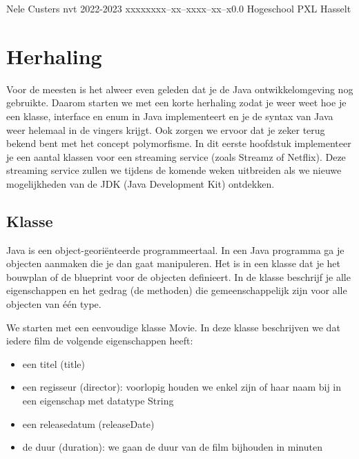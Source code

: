 \documentclass{tstextbook}
\begin{document}
       {Nele Custers}
       {nvt}
       {2022-2023}
       {xxxxx}{xxx--xx--xxxx--xx--x}{0.0}
       {Hogeschool PXL}
       {Hasselt}
       
\pagebreak



\chapter{Herhaling}

\begin{summary}
Voor de meesten is het alweer even geleden dat je de Java ontwikkelomgeving nog gebruikte. Daarom starten we met een korte herhaling zodat je weer weet hoe je een klasse, interface en enum in Java implementeert en je de syntax van Java weer helemaal in de vingers krijgt. Ook zorgen we ervoor dat je zeker terug bekend bent met het concept polymorfisme. In dit eerste hoofdstuk implementeer je een aantal klassen voor een streaming service (zoals Streamz of Netflix). Deze streaming service zullen we tijdens de komende weken uitbreiden als we nieuwe mogelijkheden van de JDK (Java Development Kit) ontdekken. 
\end{summary}

\section{Klasse}
Java is een object-geori\"enteerde programmeertaal. In een Java programma ga je  objecten aanmaken die je dan gaat manipuleren.
Het is in een klasse dat je het bouwplan of de blueprint voor de objecten definieert. In de klasse beschrijf je alle eigenschappen en het gedrag (de methoden) die gemeenschappelijk zijn voor alle objecten van \'e\'en type.

We starten met een eenvoudige klasse Movie. In deze klasse beschrijven we dat iedere film de volgende eigenschappen heeft:
\begin{itemize}
\item een titel (title)
\item een regisseur (director): voorlopig houden we enkel zijn of haar naam bij in een eigenschap met datatype String
\item een releasedatum (releaseDate)
\item de duur (duration): we gaan de duur van de film bijhouden in minuten
\end{itemize}
\end{document}
